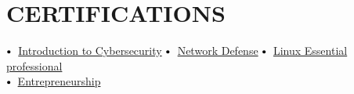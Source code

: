\documentclass[letterpaper,11pt]{article}
\newcommand\sbullet[1][.5]{\mathbin{\vcenter{\hbox{\scalebox{#1}{$\bullet$}}}}}
\begin{document}
\section{CERTIFICATIONS}

$\sbullet[.75] \hspace{0.1cm}$ {\href{https://www.credly.com/badges/5f4cbaec-1979-44e5-afb2-48cdfc02e88c?source=linked_in_profile}{Introduction to Cybersecurity}} \hspace{1.6cm}
$\sbullet[.75] \hspace{0.1cm}$ {\href{https://www.credly.com/badges/bebc273f-f36d-4e00-b05c-86109980fc41?source=linked_in_profile}{Network Defense}} \hspace{2.59cm}
$\sbullet[.75] \hspace{0.2cm}${\href{https://drive.google.com/file/d/12UZapdVUGpm6yqO9uifRv2qI9JxOFj_4/view} {Linux Essential professional}}\\

$\sbullet[.75] \hspace{0.2cm}${\href{https://drive.google.com/file/d/1rDtlD_lNX7WtQMjb0_PNIgaQVGKw0I7E/view}{Entrepreneurship}} \hspace{1cm}
\end{document}
